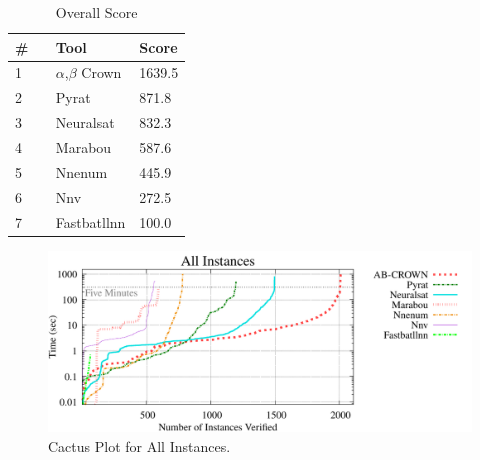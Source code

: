 

\begin{table}[h]
\begin{center}
\caption{Overall Score} \label{tab:score}
{\setlength{\tabcolsep}{2pt}
\begin{tabular}[h]{@{}lll@{}}
\toprule
\textbf{\# ~} & \textbf{Tool} & \textbf{Score}\\
\midrule
1 & $\alpha$,$\beta$ Crown & 1639.5 \\
2 & Pyrat & 871.8 \\
3 & Neuralsat & 832.3 \\
4 & Marabou & 587.6 \\
5 & Nnenum & 445.9 \\
6 & Nnv & 272.5 \\
7 & Fastbatllnn & 100.0 \\
\bottomrule
\end{tabular}
}
\end{center}
\end{table}



\begin{figure}[h]
\centerline{\includegraphics[width=\textwidth]{cactus/all.pdf}}
\caption{Cactus Plot for All Instances.}
\label{fig:quantPic}
\end{figure}

